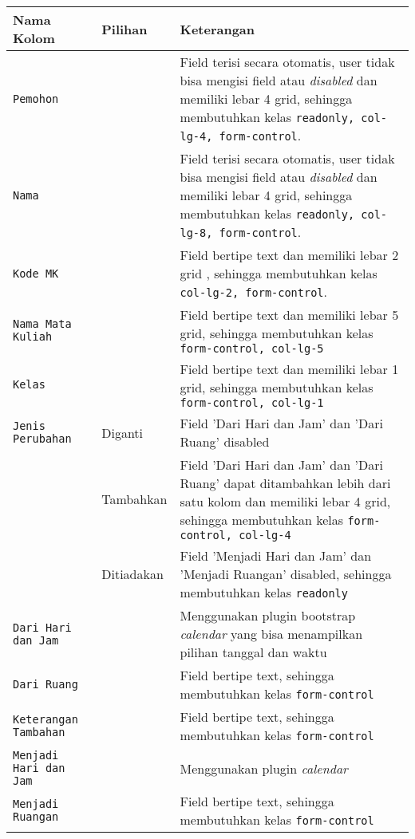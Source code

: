 \begin{tabular}{ |p{4cm}|p{2cm}|p{10cm}|}
	\hline
	Nama Kolom & Pilihan & Keterangan\\
	\hline
	\texttt{Pemohon} &  &Field terisi secara otomatis, user tidak bisa mengisi field atau \textit{disabled} dan memiliki lebar 4 grid, sehingga membutuhkan kelas \verb|readonly, col-lg-4, form-control|.\\
	\hline
	\texttt{Nama} &  & Field terisi secara otomatis, user tidak bisa mengisi field atau \textit{disabled} dan memiliki lebar 4 grid, sehingga membutuhkan kelas \verb|readonly, col-lg-8, form-control|.\\
	\hline
	\texttt{Kode MK} & & Field bertipe text dan memiliki lebar 2 grid , sehingga membutuhkan kelas \verb|col-lg-2, form-control|.\\
	\hline
	\texttt{Nama Mata Kuliah} & & Field bertipe text dan memiliki lebar 5 grid, sehingga membutuhkan kelas \verb|form-control, col-lg-5| \\
	\hline
	\texttt{Kelas} &  & Field bertipe text dan memiliki lebar 1 grid, sehingga membutuhkan kelas \verb|form-control, col-lg-1| \\
	\hline
	\texttt{Jenis Perubahan} & Diganti &  Field 'Dari Hari dan Jam' dan 'Dari Ruang' disabled  \\
	& Tambahkan &    Field 'Dari Hari dan Jam' dan 'Dari Ruang' dapat ditambahkan lebih dari satu kolom dan memiliki lebar 4 grid, sehingga membutuhkan kelas \verb|form-control, col-lg-4|\\	 
	& Ditiadakan &  Field 'Menjadi Hari dan Jam' dan 'Menjadi Ruangan' disabled, sehingga membutuhkan kelas \verb|readonly|  \\
	\hline
	\texttt{Dari Hari dan Jam} &  & Menggunakan plugin bootstrap \textit{calendar} yang bisa menampilkan pilihan tanggal dan waktu \\
	\hline
	\texttt{Dari Ruang} &  & Field bertipe text, sehingga membutuhkan kelas \verb|form-control| \\
	\hline
	\texttt{Keterangan Tambahan} &  & Field bertipe text, sehingga membutuhkan kelas \verb|form-control| \\
	\hline
	\texttt{Menjadi Hari dan Jam} &  & Menggunakan plugin \textit{calendar} \\
	\hline
	\texttt{Menjadi Ruangan} &  & Field bertipe text, sehingga membutuhkan kelas \verb|form-control| \\
	\hline
\end{tabular}

